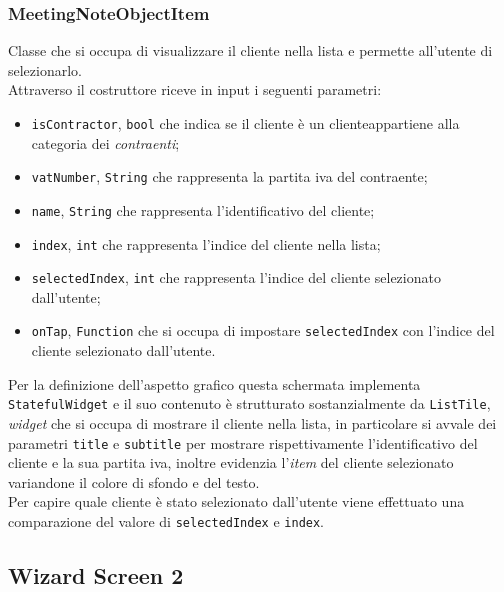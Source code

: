 \subsubsection*{MeetingNoteObjectItem}
\label{subsubsec:meeting-note-object-item}

Classe che si occupa di visualizzare il cliente nella lista e permette all'utente di selezionarlo. \\
Attraverso il costruttore riceve in input i seguenti parametri:
\begin{itemize}
    \item \lstinline{isContractor}, \lstinline{bool} che indica se il cliente è un \gls{cliente}\glsoccur appartiene alla categoria dei \emph{contraenti};
    \item \lstinline{vatNumber}, \lstinline{String} che rappresenta la partita iva del contraente;
    \item \lstinline{name}, \lstinline{String} che rappresenta l'identificativo del cliente;
    \item \lstinline{index}, \lstinline{int} che rappresenta l'indice del cliente nella lista;
    \item \lstinline{selectedIndex}, \lstinline{int} che rappresenta l'indice del cliente selezionato dall'utente;
    \item \lstinline{onTap}, \lstinline{Function} che si occupa di impostare \lstinline{selectedIndex} con l'indice del cliente selezionato dall'utente.
\end{itemize}
Per la definizione dell'aspetto grafico questa schermata implementa \lstinline{StatefulWidget} e il suo contenuto è strutturato sostanzialmente da \lstinline{ListTile}\cite{site:list-tile}, \emph{widget} che si occupa di mostrare il cliente nella lista, in particolare si avvale dei parametri \lstinline{title} e \lstinline{subtitle} per mostrare rispettivamente l'identificativo del cliente e la sua partita iva, inoltre evidenzia l'\emph{item} del cliente selezionato variandone il colore di sfondo e del testo.\\
Per capire quale cliente è stato selezionato dall'utente viene effettuato una comparazione del valore di \lstinline{selectedIndex} e \lstinline{index}.

\subsection{Wizard Screen 2}
\label{subsec:wizard-screen-2}


